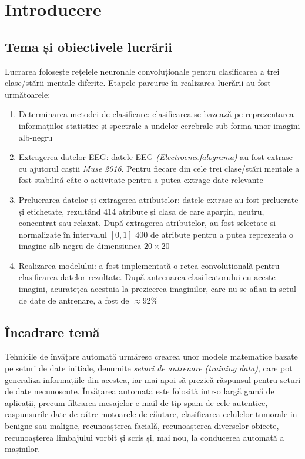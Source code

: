 \chapter{Introducere}\label{ch:1intro}

\section{Tema și obiectivele lucrării}
Lucrarea folosește rețelele neuronale convoluționale pentru clasificarea a trei clase/stării mentale diferite. Etapele parcurse în realizarea lucrării au fost următoarele:
\begin{enumerate}
\item Determinarea metodei de clasificare: clasificarea se bazează pe reprezentarea informațiilor statistice și spectrale a undelor cerebrale sub forma unor imagini alb-negru
\item Extragerea datelor EEG: datele EEG \textit{(Electroencefalograma)} au fost extrase cu ajutorul caștii \textit{Muse 2016}. Pentru fiecare din cele trei clase/stări mentale a fost stabilită câte o activitate pentru a putea extrage date relevante
\item Prelucrarea datelor și extragerea atributelor: datele extrase au fost prelucrate și etichetate, rezultând 414 atribute și clasa de care aparțin, neutru, concentrat sau relaxat. După extragerea atributelor, au fost selectate și normalizate în intervalul $[0,1]$ 400 de atribute pentru a putea reprezenta o imagine alb-negru de dimensiunea $20\times20$
\item Realizarea modelului: a fost implementată o rețea convoluțională pentru clasificarea datelor rezultate. După antrenarea clasificatorului cu aceste imagini, acuratețea acestuia la prezicerea imaginilor, care nu se aflau in setul de date de antrenare, a fost de $\approx92\%$
\end{enumerate}

\section{Încadrare temă}
Tehnicile de învățare automată urmăresc crearea unor modele matematice bazate pe seturi de date inițiale, denumite \textit{seturi de antrenare (training data)}, care pot generaliza informațiile din acestea, iar mai apoi să prezică răspunsul pentru seturi de date necunoscute. Învățarea automată este folosită intr-o largă gamă de aplicații, precum filtrarea mesajelor e-mail de tip spam de cele autentice, răspunsurile date de către motoarele de căutare, clasificarea celulelor tumorale in benigne sau maligne, recunoașterea facială, recunoașterea diverselor obiecte, recunoașterea limbajului vorbit și scris și, mai nou, la conducerea automată a mașinilor. 

